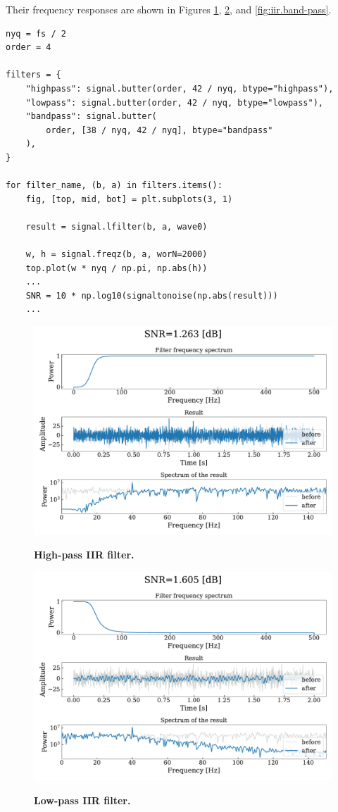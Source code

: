 \documentclass[13pt,a4paper]{article}
\begin{document}
Their frequency responses are shown in Figures \ref{fig:iir.high-pass}, \ref{fig:iir.low-pass}, and \ref{fig:iir.band-pass}.

\begin{lstlisting}[caption={\textbf{Code snippet for applying the IIR filters.}}]
nyq = fs / 2
order = 4

filters = {
    "highpass": signal.butter(order, 42 / nyq, btype="highpass"),
    "lowpass": signal.butter(order, 42 / nyq, btype="lowpass"),
    "bandpass": signal.butter(
        order, [38 / nyq, 42 / nyq], btype="bandpass"
    ),
}

for filter_name, (b, a) in filters.items():
    fig, [top, mid, bot] = plt.subplots(3, 1)

    result = signal.lfilter(b, a, wave0)

    w, h = signal.freqz(b, a, worN=2000)
    top.plot(w * nyq / np.pi, np.abs(h))
    ...
    SNR = 10 * np.log10(signaltonoise(np.abs(result)))
    ...
\end{lstlisting}

\begin{figure}[ht!]
    \centering
    \caption{\textbf{High-pass IIR filter.}}
    \includegraphics[width=0.9\linewidth]{iir.highpass.pdf}
    \label{fig:iir.high-pass}
\end{figure}

\begin{figure}[ht!]
    \centering
    \caption{\textbf{Low-pass IIR filter.}}
    \includegraphics[width=0.9\linewidth]{iir.lowpass.pdf}
    \label{fig:iir.low-pass}
\end{figure}
\end{document}
